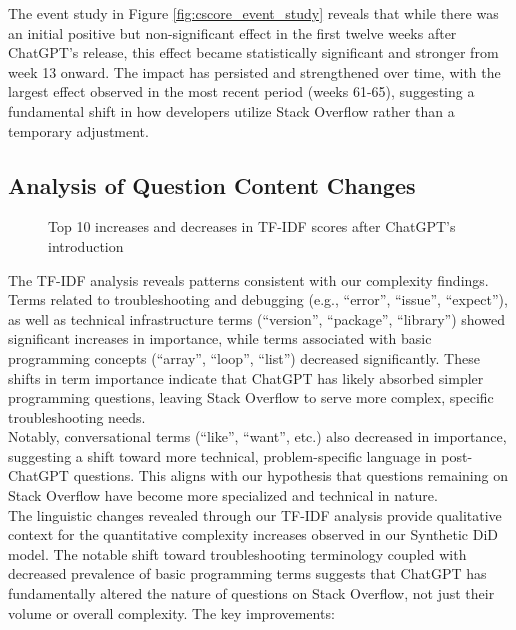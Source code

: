 The event study in Figure \ref{fig:cscore_event_study} reveals that while there was an initial positive but non-significant effect in the first twelve weeks after ChatGPT's release, this effect became statistically significant and stronger from week 13 onward. The impact has persisted and strengthened over time, with the largest effect observed in the most recent period (weeks 61-65), suggesting a fundamental shift in how developers utilize Stack Overflow rather than a temporary adjustment.


\subsection{Analysis of Question Content Changes}
\begin{figure}[H]
    \centering
    
    \caption{Top 10 increases and decreases in TF-IDF scores after ChatGPT's introduction}
    \label{fig:tfidf}
\end{figure}

The TF-IDF analysis reveals patterns consistent with our complexity findings. Terms related to troubleshooting and debugging (e.g., \enquote{error}, \enquote{issue}, \enquote{expect}), as well as technical infrastructure terms (\enquote{version}, \enquote{package}, \enquote{library}) showed significant increases in importance, while terms associated with basic programming concepts (\enquote{array}, \enquote{loop}, \enquote{list}) decreased significantly. These shifts in term importance indicate that ChatGPT has likely absorbed simpler programming questions, leaving Stack Overflow to serve more complex, specific troubleshooting needs.\\

Notably, conversational terms (\enquote{like}, \enquote{want}, etc.) also decreased in importance, suggesting a shift toward more technical, problem-specific language in post-ChatGPT questions. This aligns with our hypothesis that questions remaining on Stack Overflow have become more specialized and technical in nature.\\

The linguistic changes revealed through our TF-IDF analysis provide qualitative context for the quantitative complexity increases observed in our Synthetic DiD model. The notable shift toward troubleshooting terminology coupled with decreased prevalence of basic programming terms suggests that ChatGPT has fundamentally altered the nature of questions on Stack Overflow, not just their volume or overall complexity.
The key improvements:


